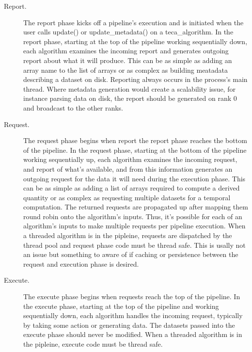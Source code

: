 \documentclass[a4paper,10pt,DIV=12]{scrreprt}
\begin{document}
\noindent\begin{minipage}{0.85\textwidth}
\vspace{2mm}
\begin{description}
\item[Report.] The report phase kicks off a pipeline's execution and is initiated when the user calls update() or update\_metadata() on a teca\_algorithm. In the report phase, starting at the top of the pipeline working sequentially down, each algorithm examines the incoming report and generates outgoing report about what it will produce. This can be as simple as adding an array name to the list of arrays or as complex as building meatadata describing a dataset on disk. Reporting always occurs in the process's main thread. Where metadata generation would create a scalability issue, for instance parsing data on disk, the report should be generated on rank 0 and broadcast to the other ranks.
\item [Request.] The request phase begins when report the report phase reaches the bottom of the pipeline. In the request phase, starting at the bottom of the pipeline working sequentially up, each algorithm examines the incoming request, and report of what's available, and from this information generates an outgoing request for the data it will need during the execution phase. This can be as simple as adding a list of arrays required to compute a derived quantity or as complex as requesting multiple datasets for a temporal computation. The returned requests are propagated up after mapping them round robin onto the algorithm's inputs. Thus, it's possible for each of an algorithm's inputs to make multiple requests per pipeline execution. When a threaded algorithm is in the pipleine, requests are dispatched by the thread pool and request phase code must be thread safe. This is usally not an issue but something to aware of if caching or persistence between the request and execution phase is desired.
\item [Execute.] The execute phase begins when requests reach the top of the pipeline. In the execute phase, starting at the top of the pipeline and working sequentially down, each algorithm handles the incoming request, typically by taking some action or generating data. The datasets passed into the execute phase should never be modified. When a threaded algorithm is in the pipleine, execute code must be thread safe.
\end{description}
\vspace{2mm}
\end{minipage}
\end{document}
